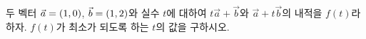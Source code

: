 두 벡터 $\vec{a}=(1{,}\mkern3mu\mathopen{}0)$, $\vec{b}=(1{,}\mkern3mu\mathopen{}2)$와 실수 $t$에 대하여 $t\vec{a}+\vec{b}$와 $\vec{a}+t\vec{b}$의 내적을 $f(t)$라 하자. $f(t)$가 최소가 되도록 하는 $t$의 값을 구하시오.
